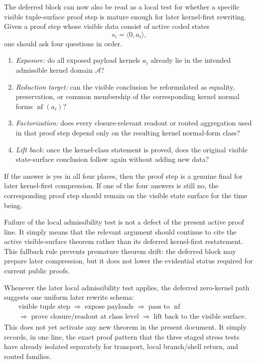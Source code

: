 \begin{remark}\label{rem:qam-zero-kernel-local-test}
The deferred block can now also be read as a local test for whether a specific visible tuple-surface proof step is mature enough for later kernel-first rewriting. Given a proof step whose visible data consist of active coded states
\[
s_i=\langle 0,a_i\rangle,
\]
one should ask four questions in order.
\begin{enumerate}
\item \emph{Exposure:} do all exposed payload kernels $a_i$ already lie in the intended admissible kernel domain $\mathcal A$?
\item \emph{Reduction target:} can the visible conclusion be reformulated as equality, preservation, or common membership of the corresponding kernel normal forms $\operatorname{nf}(a_i)$?
\item \emph{Factorization:} does every closure-relevant readout or routed aggregation used in that proof step depend only on the resulting kernel normal-form class?
\item \emph{Lift back:} once the kernel-class statement is proved, does the original visible state-surface conclusion follow again without adding new data?
\end{enumerate}
If the answer is yes in all four places, then the proof step is a genuine final for later kernel-first compression. If one of the four answers is still no, the corresponding proof step should remain on the visible state surface for the time being.
\end{remark}

\begin{remark}\label{rem:qam-zero-kernel-fallback}
Failure of the local admissibility test is not a defect of the present active proof line. It simply means that the relevant argument should continue to cite the active visible-surface theorem rather than its deferred kernel-first restatement. This fallback rule prevents premature theorem drift: the deferred block may prepare later compression, but it does not lower the evidential status required for current public proofs.
\end{remark}

\begin{remark}\label{rem:qam-zero-kernel-rewrite-schema}
Whenever the later local admissibility test applies, the deferred zero-kernel path suggests one uniform later rewrite schema:
\[
\begin{aligned}
&\text{visible tuple step}
\;\Longrightarrow\;
\text{expose payloads}
\;\Longrightarrow\;
\text{pass to }\operatorname{nf}
\\[0.2em]
&\Longrightarrow\;
\text{prove closure/readout at class level}
\;\Longrightarrow\;
\text{lift back to the visible surface}.
\end{aligned}
\]
This does not yet activate any new theorem in the present document. It simply records, in one line, the exact proof pattern that the three staged stress tests have already isolated separately for transport, local branch/shell return, and routed families.
\end{remark}

